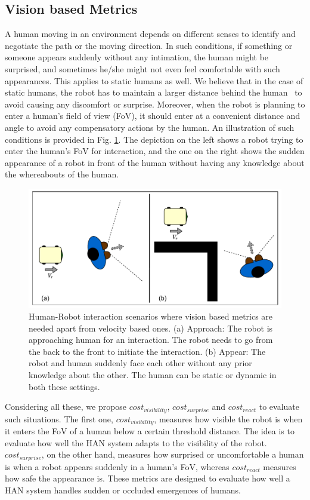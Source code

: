 \subsection{Vision based Metrics}
A human moving in an environment depends on different senses to identify and negotiate the path or the moving direction. In such conditions, if something or someone appears suddenly without any intimation, the human might be surprised, and sometimes he/she might not even feel comfortable with such appearances. This applies to static humans as well. We believe that in the case of static humans, the robot has to maintain a larger distance behind the human~\cite{avrunin2014socially} to avoid causing any discomfort or surprise. Moreover, when the robot is planning to enter a human's field of view (FoV), it should enter at a convenient distance and angle to avoid any compensatory actions by the human. An illustration of such conditions is provided in Fig. \ref{fig:vis_metrics}. The depiction on the left shows a robot trying to enter the human's FoV for interaction, and the one on the right shows the sudden appearance of a robot in front of the human without having any knowledge about the whereabouts of the human.

\begin{figure}[!h]
    \centering
    \includegraphics[width=0.9\columnwidth]{images/chapter6/vision_metrics.pdf}
    \caption{Human-Robot interaction scenarios where vision based metrics are needed apart from velocity based ones. (a) Approach: The robot is approaching human for an interaction. The robot needs to go from the back to the front to initiate the interaction. (b) Appear: The robot and human suddenly face each other without any prior knowledge about the other. The human can be static or dynamic in both these settings.}
    \label{fig:vis_metrics}
\end{figure}

Considering all these, we propose $cost_{visibility}$, $cost_{surprise}$ and $cost_{react}$ to evaluate such situations. The first one, $cost_{visibility}$, measures how visible the robot is when it enters the FoV of a human below a certain threshold distance. The idea is to evaluate how well the HAN system adapts to the visibility of the robot. $cost_{surprise}$, on the other hand, measures how surprised or uncomfortable a human is when a robot appears suddenly in a human's FoV, whereas $cost_{react}$ measures how safe the appearance is. These metrics are designed to evaluate how well a HAN system handles sudden or occluded emergences of humans.  

